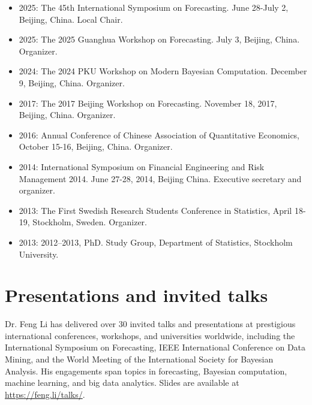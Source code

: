 \documentclass[twoside,a4paper]{article}
\begin{document}
\begin{itemize}

\item 2025: The 45th International Symposium on Forecasting. June 28-July 2, Beijing, China. Local Chair.
\item 2025: The 2025 Guanghua Workshop on Forecasting. July 3, Beijing, China. Organizer.
\item 2024: The 2024 PKU Workshop on Modern Bayesian Computation. December 9, Beijing, China. Organizer.
\item 2017: The 2017 Beijing Workshop on Forecasting. November 18, 2017, Beijing, China. Organizer.
\item 2016: Annual Conference of Chinese Association of Quantitative Economics, October 15-16, Beijing, China. Organizer.
\item 2014: International Symposium on Financial Engineering and Risk Management 2014. June 27-28, 2014, Beijing China. Executive secretary and organizer.
\item 2013: The First Swedish Research Students Conference in Statistics, April 18-19, Stockholm, Sweden. Organizer.
\item 2013: 2012–2013, PhD. Study Group, Department of Statistics, Stockholm University.
\end{itemize}

\section{Presentations and invited talks}

Dr. Feng Li has delivered over 30 invited talks and presentations at prestigious international conferences, workshops, and universities worldwide, including the International Symposium on Forecasting, IEEE International Conference on Data Mining, and the World Meeting of the International Society for Bayesian Analysis. His engagements span topics in forecasting, Bayesian computation, machine learning, and big data analytics. Slides are available at \url{https://feng.li/talks/}.
\end{document}
